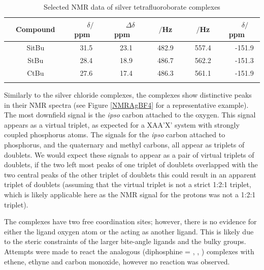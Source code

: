 \begin{table}[h]
\caption[Selected NMR data of silver tetrafluoroborate complexes]{Selected NMR data of silver tetrafluoroborate complexes} 
\vspace{1em}
\label{table:silverBF4}
\small
\begin{center}
\begin{tabular}{ c c c c c c}
	\toprule{}
	~~\bfseries{Compound}~~&~~\bfseries{$\delta$\phosphorus{}$/$ppm}~~&~~\bfseries{$\Delta\delta$ ppm}~~&~~\bfseries{\JAgPseven{}$/$Hz}~~&~~\bfseries{\JAgPnine{}$/$Hz}~~&~~\bfseries{$\delta$\fluorine{}$/$ppm}~~\\
	\midrule{}
	~~SitBu~~&~~31.5~~&~~23.1~~&~~482.9~~&~~557.4~~&~~-151.9\\ 
	~~StBu~~&~~28.4~~&~~18.9~~&~~486.7~~&~~562.2~~&~~-151.3\\
	~~CtBu~~&~~27.6~~&~~17.4~~&~~486.3~~&~~561.1~~&~~-151.9\\
	\bottomrule{}
\end{tabular}
\end{center}
\end{table}

Similarly to the silver chloride complexes, the  complexes show distinctive peaks in their \carbon{} NMR spectra (see Figure \ref{NMRAgBF4} for a representative example).  The most downfield signal is the \emph{ipso} carbon attached to the oxygen.  This signal appears as a virtual triplet, as expected for a XAA'X' system with strongly coupled phosphorus atoms.  The signals for the \emph{ipso} carbon attached to phosphorus, and the quaternary and methyl \tBu carbons, all appear as triplets of doublets.  We would expect these signals to appear as a pair of virtual triplets of doublets, if the two left most peaks of one triplet of doublets overlapped with the two central peaks of the other triplet of doublets this could result in an apparent triplet of doublets (assuming that the virtual triplet is not a strict 1:2:1 triplet, which is likely applicable here as the \proton{} NMR signal for the \tBu{} protons was not a 1:2:1 triplet).

The  complexes have two free coordination sites; however, there is no evidence for either the ligand oxygen atom or the  acting as another ligand.  This is likely due to the steric constraints of the larger bite-angle ligands and the bulky \tBu{} groups.  Attempts were made to react the analogous  (diphosphine = \tBuxantphos{}, \tBusixantphos{}, \tButhixantphos{}) complexes with ethene, ethyne and carbon monoxide, however no reaction was observed.

